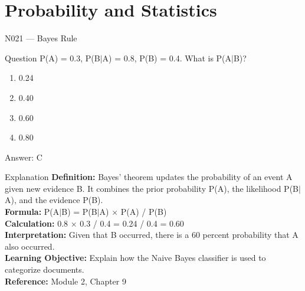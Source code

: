 \documentclass[aspectratio=169,8pt]{beamer}
\begin{document}
	\section{Probability and Statistics}
	
	\begin{frame}{N021 --- Bayes Rule}
		\begin{block}{Question}
			P(A) = 0.3, P(B$|$A) = 0.8, P(B) = 0.4. What is P(A$|$B)?
			\begin{enumerate}
				\item 0.24
				\item 0.40
				\item 0.60
				\item 0.80
			\end{enumerate}
		\end{block}
		\begin{exampleblock}{Answer: C}\end{exampleblock}
		\begin{block}{Explanation}
			\textbf{Definition:} Bayes' theorem updates the probability of an event A given new evidence B. It combines the prior probability P(A), the likelihood P(B$|$A), and the evidence P(B).\\
			\textbf{Formula:} P(A$|$B) = P(B$|$A) $\times$ P(A) / P(B)\\
			\textbf{Calculation:} 0.8 $\times$ 0.3 / 0.4 = 0.24 / 0.4 = 0.60\\
			\textbf{Interpretation:} Given that B occurred, there is a 60 percent probability that A also occurred.\\
			\textbf{Learning Objective:} Explain how the Naive Bayes classifier is used to categorize documents.\\
			\textbf{Reference:} Module 2, Chapter 9
		\end{block}
	\end{frame}
	
\end{document}
